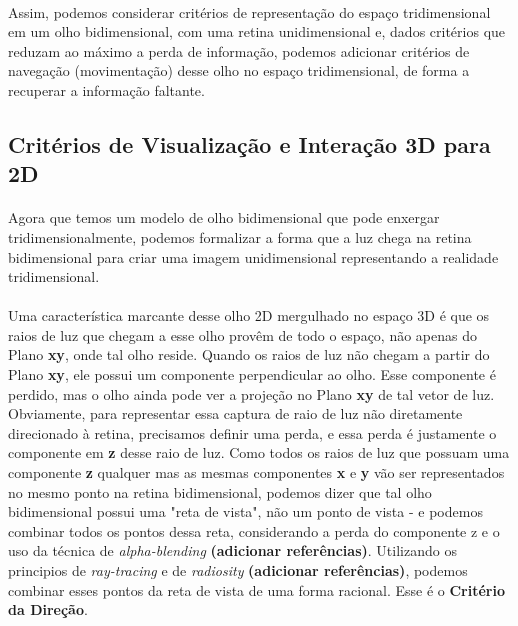 \documentclass{article}
\begin{document}
	\paragraph{}
	Assim, podemos considerar critérios de representação do espaço tridimensional em um olho bidimensional, com uma retina unidimensional e, dados critérios que reduzam ao máximo a perda de informação, podemos adicionar critérios de navegação (movimentação) desse olho no espaço tridimensional, de forma a recuperar a informação faltante.
	
	\subsection{Critérios de Visualização e Interação 3D para 2D} \label{criterios}
	
	\paragraph{}
	Agora que temos um modelo de olho bidimensional que pode enxergar tridimensionalmente, podemos formalizar a forma que a luz chega na retina bidimensional para criar uma imagem unidimensional representando a realidade tridimensional.
	
	\paragraph{}
	Uma característica marcante desse olho 2D mergulhado no espaço 3D é que os raios de luz que chegam a esse olho provêm de todo o espaço, não apenas do Plano \textbf{xy}, onde tal olho reside. Quando os raios de luz não chegam a partir do Plano \textbf{xy}, ele possui um componente perpendicular ao olho. Esse componente é perdido, mas o olho ainda pode ver a projeção no Plano \textbf{xy} de tal vetor de luz. Obviamente, para representar essa captura de raio de luz não diretamente direcionado à retina, precisamos definir uma perda, e essa perda é justamente o componente em \textbf{z} desse raio de luz. Como todos os raios de luz que possuam uma componente \textbf{z} qualquer mas as mesmas componentes \textbf{x} e \textbf{y} vão ser representados no mesmo ponto na retina bidimensional, podemos dizer que tal olho bidimensional possui uma "reta de vista", não um ponto de vista - e podemos combinar todos os pontos dessa reta, considerando a perda do componente z e o uso da técnica de \textit{alpha-blending} \textbf{(adicionar referências)}. Utilizando os principios de \textit{ray-tracing} e de \textit{radiosity} \textbf{(adicionar referências)}, podemos combinar esses pontos da reta de vista de uma forma racional. Esse é o \textbf{Critério da Direção}.
	
\end{document}
